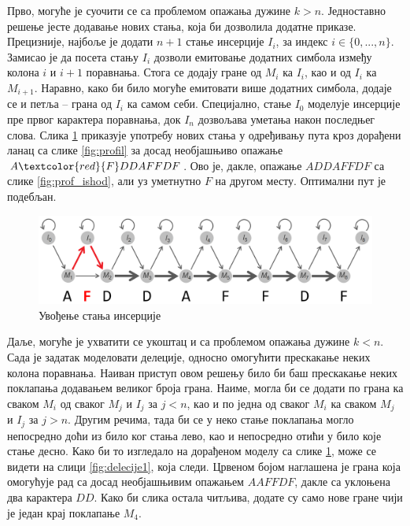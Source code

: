 \documentclass[12pt,oneside]{memoir}
\begin{document}
\begin{CJK}{UTF8}{ipxm}
Прво, могуће је суочити се са проблемом опажања дужине $k > n$. Једноставно решење јесте додавање нових стања, која би дозволила додатне приказе. Прецизније, најбоље је додати $n+1$ стање инсерције $I_i$, за индекс $i \in \{0, ..., n\}$. Замисао је да посета стању $I_i$ дозволи емитовање додатних симбола између колона $i$ и $i+1$ поравнања. Стога се додају гране од $M_i$ ка $I_i$, као и од $I_i$ ка $M_{i+1}$. Наравно, како би било могуће емитовати више додатних симбола, додаје се и петља -- грана од $I_i$ ка самом себи. Специјално, стање $I_0$ моделује инсерције пре првог карактера поравнања, док $I_n$ дозвољава уметања након последњег слова. Слика \ref{fig:insercije} приказује употребу нових стања у одређивању пута кроз дорађени ланац са слике \ref{fig:profil} за досад необјашњиво опажање $A\textcolor{red}{F}DDAFFDF$. Ово је, дакле, опажање $ADDAFFDF$ са слике \ref{fig:prof_ishod}, али уз уметнутно $F$ на другом месту. Оптимални пут је подебљан.

\begin{figure}[H]
  \centering
  \includegraphics[width=\textwidth]{insercije.png}
  \caption{Увођење стања инсерције \cite{compeau2015}}
  \label{fig:insercije}
\end{figure}

Даље, могуће је ухватити се укоштац и са проблемом опажања дужине $k < n$. Сада је задатак моделовати делеције, односно омогућити прескакање неких колона поравнања. Наиван приступ овом решењу било би баш прескакање неких поклапања додавањем великог броја грана. Наиме, могла би се додати по грана ка сваком $M_i$ од сваког $M_j$ и $I_j$ за $j < n$, као и по једна од сваког $M_i$ ка сваком $M_j$ и $I_j$ за $j > n$. Другим речима, тада би се у неко стање поклапања могло непосредно доћи из било ког стања лево, као и непосредно отићи у било које стање десно. Како би то изгледало на дорађеном моделу са слике \ref{fig:insercije}, може се видети на слици \ref{fig:delecije1}, која следи. Црвеном бојом наглашена је грана која омогућује рад са досад необјашњивим опажањем $AAFFDF$, дакле са уклоњена два карактера $DD$. Како би слика остала читљива, додате су само нове гране чији је један крај поклапање $M_4$.


\end{CJK}
\end{document}
